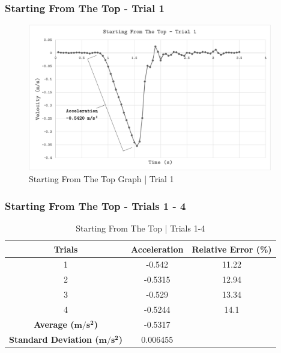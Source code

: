 \documentclass[a4paper,12pt]{article}
\begin{document}
\subsubsection{Starting From The Top - Trial 1}
\begin{figure}[H]
	\begin{center}
		\includegraphics[width=0.95\textwidth]{cartg1.png}
	\end{center}
	\caption{Starting From The Top Graph | Trial 1}
	\label{fig: cartg1}
\end{figure} 

\subsubsection{Starting From The Top - Trials 1 - 4}

\begin{table}[H]
\centering
\begin{tabular}{@{}ccc@{}}
\toprule
\textbf{Trials} & \textbf{Acceleration} & \textbf{Relative Error (\%)} \\ \midrule
1 & -0.542 & 11.22 \\
2 & -0.5315 & 12.94 \\
3 & -0.529 & 13.34 \\
4 & -0.5244 & 14.1 \\ \midrule
\textbf{Average ($\boldsymbol{m/s^2}$)} & -0.5317 &  \\
\textbf{Standard Deviation ($\boldsymbol{m/s^2}$)} & 0.006455 &  \\ \bottomrule
\end{tabular}
\caption{Starting From The Top | Trials 1-4 }
\label{tab:ip-sftt}
\end{table}
\end{document}
